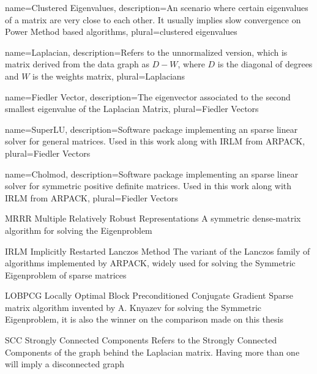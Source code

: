                  {
                   name=Clustered Eigenvalues,
                   description={An scenario where certain eigenvalues of a matrix are very close to each other. It usually implies slow convergence on Power Method based algorithms},
                   plural=clustered eigenvalues
                 }

                 {
                   name=Laplacian,
                   description={Refers to the unnormalized version, which is matrix derived from the data graph as $D - W$, where $D$ is the diagonal of degrees and $W$ is the weights matrix},
                   plural=Laplacians
                 }

                 {
                   name=Fiedler Vector,
                   description={The eigenvector associated to the second smallest eigenvalue of the \gls{Laplacian} Matrix},
                   plural=Fiedler Vectors
                 }

                 {
                   name=SuperLU,
                   description={Software package implementing an sparse linear solver for general matrices. Used in this work along with \gls{IRLM} from ARPACK},
                   plural=Fiedler Vectors
                 }

                 {
                   name=Cholmod,
                   description={Software package implementing an sparse linear solver for symmetric positive definite matrices. Used in this work along with \gls{IRLM} from ARPACK},
                   plural=Fiedler Vectors
                 }

  {MRRR}
  {Multiple Relatively Robust Representations}
  {A symmetric dense-matrix algorithm for solving the Eigenproblem}

  {IRLM}
  {Implicitly Restarted Lanczos Method}
  {The variant of the Lanczos family of algorithms implemented by ARPACK, widely used for solving the Symmetric Eigenproblem of sparse matrices}

  {LOBPCG}
  {Locally Optimal Block Preconditioned Conjugate Gradient}
  {Sparse matrix algorithm invented by A. Knyazev for solving the Symmetric Eigenproblem, it is also the winner on the comparison made on this thesis}

  {SCC}
  {Strongly Connected Components}
  {Refers to the Strongly Connected Components of the graph behind the \gls{Laplacian} matrix. Having more than one will imply a disconnected graph}

